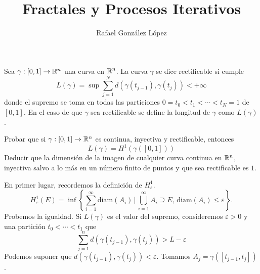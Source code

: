 \documentclass[twoside]{article}
\begin{document}
\title{Fractales y Procesos Iterativos}
\author{Rafael González López}
\maketitle

\begin{ejercicio}{3}
Sea $\gamma:[0,1]\to \mathbb{R}^n$ una curva en $\mathbb{R}^n$. La curva $\gamma$ se dice rectificable si cumple
$$
L(\gamma) = \sup \sum_{j=1}^N d(\gamma(t_{j-1}),\gamma(t_j)) < +\infty
$$
donde el supremo se toma en todas las particiones $0 = t_0 < t_1< \cdots< t_N = 1$ de $[0,1]$. En el caso de que $\gamma$ sea rectificable se define la longitud de $\gamma$ como $L(\gamma)$. 

Probar que si $\gamma:[0,1]\to \mathbb{R}^n$ es continua, inyectiva y rectificable, entonces
$$
L(\gamma) = H^1(\gamma([0,1]))
$$
Deducir que la dimensión de la imagen de cualquier curva continua en $\mathbb{R}^n$, inyectiva salvo a lo más en un número finito de puntos y que sea rectificable es $1$.
\end{ejercicio}
\begin{solucion}
En primer lugar, recordemos la definición de $H^1_\varepsilon$.
$$
H^1_\varepsilon(E) = \inf\left\{\sum\limits_{i=1}^\infty\text{diam}(A_i)\,\bigg|\,\bigcup\limits_{i=1}^\infty A_i \supseteq E,\,\text{diam}(A_i)\leq \varepsilon\right\}.
$$
Probemos la igualdad. Si $L(\gamma)$ es el valor del supremo, consideremos $\varepsilon >0$ y una partición $t_0<\cdots < t_1$ que 
$$
\sum_{j=1}^n d(\gamma(t_{j-1}),\gamma(t_j)) > L -\varepsilon
$$
Podemos suponer que $d(\gamma(t_{j-1}),\gamma(t_j))<\varepsilon$. Tomamos $A_j = \gamma([t_{j-1},t_j])$.
\end{solucion}
\end{document}
